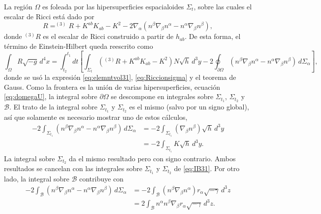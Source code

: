 La regi\'{o}n $\Omega$ es foleada por las hipersuperficies espacialoides $\Sigma_{t}$, sobre las cuales el escalar de Ricci est\'{a} dado por
%
\begin{equation}
\label{eq:Riccionsigma}
R = ^{(3)}R + K^{ab} K_{ab} - K^{2} - 2 \nabla_{\alpha} (n^{\beta} \nabla_{\beta} n^{\alpha} - n^{\alpha} \nabla_{\beta} n^{\beta}),
\end{equation}
%
donde $^{(3)}R$ es el escalar de Ricci construido a partir de $h_{ab}$. De esta forma, el t\'{e}rmino de Einstein-Hilbert queda reescrito como
%
\begin{equation}
\int_{\Omega} R \sqrt{-g} \, d^{4} x = \int^{t_{1}}_{t_{2}} dt \left[ \int_{\Sigma_{t}} (^{(3)}R + K^{ab} K_{ab} - K^{2}) N \sqrt{h} \, d^{3} y - 2 \oint_{\partial \Omega} (n^{\beta} \nabla_{\beta} n^{\alpha} - n^{\alpha} \nabla_{\beta} n^{\beta}) \, d \Sigma_{\alpha} \right],
\end{equation}
%
donde se us\'{o} la expresi\'{o}n \eqref{eq:elemntvol31}, \eqref{eq:Riccionsigma} y el teorema de Gauss. Como la frontera es la uni\'{o}n de varias hipersuperficies, ecuaci\'{o}n \eqref{eq:domegaU}, la integral sobre $\partial \Omega$ se descompone en integrales sobre $\Sigma_{t_{1}}$, $\Sigma_{t_{2}}$ y $\mathcal{B}$. El trato de la integral sobre $\Sigma_{t_{1}}$ y $\Sigma_{t_{2}}$ es el mismo (salvo por un signo global), as\'{i} que solamente es necesario mostrar uno de estos c\'{a}lculos,
%
\begin{align}
-2 \int_{\Sigma_{t_{1}}} (n^{\beta} \nabla_{\beta} n^{\alpha} - n^{\alpha} \nabla_{\beta} n^{\beta}) \, d \Sigma_{\alpha} & = -2 \int_{\Sigma_{t_{1}}} (\nabla_{\beta} n^{\beta}) \sqrt{h} \, d^{3} y \nonumber \\
& = -2 \int_{\Sigma_{t_{1}}} K \sqrt{h} \, d^{3} y.
\end{align}
%
La integral sobre $\Sigma_{t_{2}}$ da el mismo resultado pero con signo contrario. Ambos resultados se cancelan con las integrales sobre $\Sigma_{t_{1}}$ y $\Sigma_{t_{2}}$ de \eqref{eq:IB31}. Por otro lado, la integral sobre $\mathcal{B}$ contribuye con
%
\begin{align}
-2 \int_{\mathcal{B}} (n^{\beta} \nabla_{\beta} n^{\alpha} - n^{\alpha} \nabla_{\beta} n^{\beta}) \, d \Sigma_{\alpha} & = -2 \int_{\mathcal{B}} (n^{\beta} \nabla_{\beta} n^{\alpha}) r_{\alpha} \sqrt{-\gamma} \, d^{3} z \nonumber \\
& = 2 \int_{\mathcal{B}} n^{\alpha} n^{\beta} \nabla_{\beta} r_{\alpha} \sqrt{-\gamma} \, d^{3} z.
\end{align}

